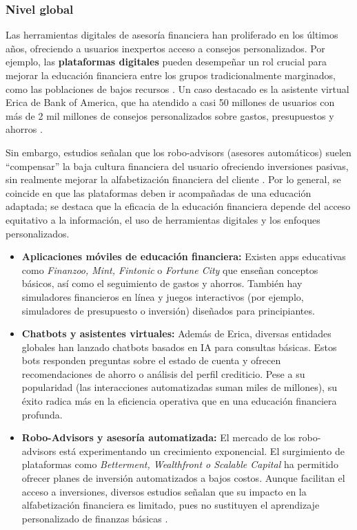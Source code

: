 {}
\subsubsection*{Nivel global}

Las herramientas digitales de asesoría financiera han proliferado en los últimos años, ofreciendo a usuarios inexpertos acceso a consejos personalizados. Por ejemplo, las \textbf{plataformas digitales} pueden desempeñar un rol crucial para mejorar la educación financiera entre los grupos tradicionalmente marginados, como las poblaciones de bajos recursos \parencite[p. 28]{RevistaCientifica01}. Un caso destacado es la asistente virtual Erica de Bank of America, que ha atendido a casi 50 millones de usuarios con más de 2 mil millones de consejos personalizados sobre gastos, presupuestos y ahorros \parencite{FundsSociety01}. 

Sin embargo, estudios señalan que los robo-advisors (asesores automáticos) suelen ``compensar'' la baja cultura financiera del usuario ofreciendo inversiones pasivas, sin realmente mejorar la alfabetización financiera del cliente \parencite[p. 5-6]{RoboAdvisors01}. Por lo general, se coincide en que las plataformas deben ir acompañadas de una educación adaptada; se destaca que la eficacia de la educación financiera depende del acceso equitativo a la información, el uso de herramientas digitales y los enfoques personalizados.

\begin{itemize}
	\item \textbf{Aplicaciones móviles de educación financiera:} Existen apps educativas como \textit{Finanzoo, Mint, Fintonic} o \textit{Fortune City} que enseñan conceptos básicos, así como el seguimiento de gastos y ahorros. También hay simuladores financieros en línea y juegos interactivos (por ejemplo, simuladores de presupuesto o inversión) diseñados para principiantes.
	
	\item \textbf{Chatbots y asistentes virtuales:} Además de Erica, diversas entidades globales han lanzado chatbots basados en IA para consultas básicas. Estos bots responden preguntas sobre el estado de cuenta y ofrecen recomendaciones de ahorro o análisis del perfil crediticio. Pese a su popularidad (las interacciones automatizadas suman miles de millones), su éxito radica más en la eficiencia operativa que en una educación financiera profunda.
	
	\item \textbf{Robo-Advisors y asesoría automatizada:} El mercado de los robo-advisors está experimentando un crecimiento exponencial. El surgimiento de plataformas como \textit{Betterment, Wealthfront o Scalable Capital} ha permitido ofrecer planes de inversión automatizados a bajos costos. Aunque facilitan el acceso a inversiones, diversos estudios señalan que su impacto en la alfabetización financiera es limitado, pues no sustituyen el aprendizaje personalizado de finanzas básicas \parencite[p. 5-6]{RoboAdvisors01}.
\end{itemize}

